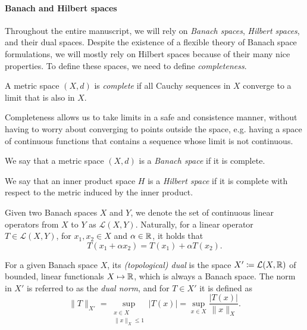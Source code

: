 \paragraph{Banach and Hilbert spaces}\label{sec:banach-hilbert-spaces}
Throughout the entire manuscript, we will rely on \emph{Banach spaces}, \emph{Hilbert spaces}, and their dual spaces. Despite the existence of a flexible theory of Banach space formulations, we will mostly rely on Hilbert spaces because of their many nice properties. To define these spaces, we need to define \emph{completeness}.
\begin{definition}[Completeness]
    A metric space $(X,d)$ is \emph{complete} if all Cauchy sequences in $X$ converge to a limit that is also in $X$.
\end{definition}
Completeness allows us to take limits in a safe and consistence manner, without having to worry about converging to points outside the space, e.g. having a space of continuous functions that contains a sequence whose limit is not continuous. 
\begin{definition}\label{def:banach-space}
    We say that a metric space $(X,d)$ is a \emph{Banach space} if it is complete.
\end{definition}
\begin{definition}\label{def:hilbert-space}
    We say that an inner product space $H$ is a \emph{Hilbert space} if it is complete with respect to the metric induced by the inner product.
\end{definition}
\begin{definition}\label{def:linear-operator}
    Given two Banach spaces $X$ and $Y$, we denote the set of continuous linear operators from $X$ to $Y$ as $\mathcal{L}(X,Y)$. Naturally, for a linear operator $T\in \mathcal{L}(X,Y)$, for $x_1,x_2\in X$ and $\alpha\in\mathbb{R}$, it holds that 
    \begin{equation}
        T(x_1+\alpha x_2) = T(x_1) + \alpha T(x_2).
    \end{equation}
\end{definition}
\begin{definition}
    For a given Banach space $X$, its \emph{(topological) dual} is the space $X'\coloneqq \mathcal{L}(X,\mathbb{R})$ of bounded, linear functionals $X\mapsto \mathbb{R}$, which is always a Banach space. The norm in $X'$ is referred to as the \emph{dual norm}, and for $T\in X'$ it is defined as 
    \begin{equation}\label{eq:dual-norm}
        \|T\|_{X'} = \sup_{\substack{x\in X\\ \|x\|_X\leq 1}} |T(x)|= \sup_{x\in X}\frac{|T(x)|}{\|x\|_X}.
    \end{equation}
\end{definition}
